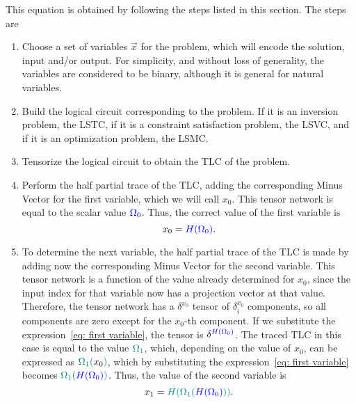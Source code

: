 This equation is obtained by following the steps listed in this section. The steps are
\begin{enumerate}
    \item Choose a set of variables $\vec{x}$ for the problem, which will encode the solution, input and/or output. For simplicity, and without loss of generality, the variables are considered to be binary, although it is general for natural variables.

    \item Build the logical circuit corresponding to the problem. If it is an inversion problem, the LSTC, if it is a constraint satisfaction problem, the LSVC, and if it is an optimization problem, the LSMC. 

    \item Tensorize the logical circuit to obtain the TLC of the problem.

    \item Perform the half partial trace of the TLC, adding the corresponding Minus Vector for the first variable, which we will call $x_0$. This tensor network is equal to the scalar value ${\color{blue} \Omega_0}$. Thus, the correct value of the first variable is
    \begin{equation}\label{eq: first variable}
        x_0={\color{blue} H(\Omega_0)}.
    \end{equation}

    \item To determine the next variable, the half partial trace of the TLC is made by adding now the corresponding Minus Vector for the second variable. This tensor network is a function of the value already determined for $x_0$, since the input index for that variable now has a projection vector at that value. Therefore, the tensor network has a $\delta^{x_0}$ tensor of $\delta^{x_0}_{i}$ components, so all components are zero except for the $x_0$-th component. If we substitute the expression~\ref{eq: first variable}, the tensor is $\delta^{{\color{blue} H(\Omega_0)}}$. The traced TLC in this case is equal to the value ${\color{teal}\Omega_1}$, which, depending on the value of $x_0$, can be expressed as ${\color{teal}\Omega_1(}x_0{\color{teal} )}$, which by substituting the expression~\ref{eq: first variable} becomes ${\color{teal}\Omega_1(}{\color{blue} H(\Omega_0)}{\color{teal} )}$. Thus, the value of the second variable is
    \begin{equation}
        x_1 = {\color{teal} H(\Omega_1(}{\color{blue} H(\Omega_0)}{\color{teal} ))}.
    \end{equation}
    

\end{enumerate}
